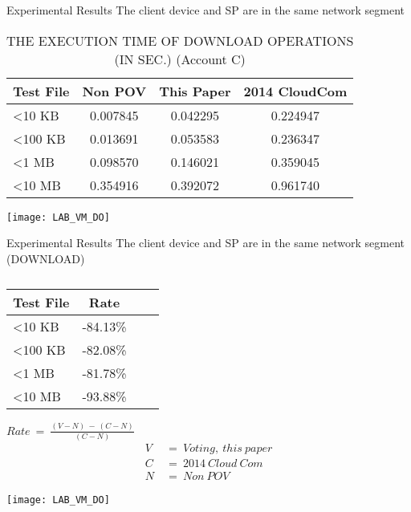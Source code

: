 \begin{frame}{Experimental Results}
{The client device and SP are in the same network segment}
	\scriptsize
    \begin{table}[] 
    \centering
    \caption{THE EXECUTION TIME OF \alert{DOWNLOAD} OPERATIONS (IN SEC.) (Account C)}
    \begin{tabular}{lccc}
        Test File        & Non POV  & This Paper & 2014 CloudCom \\ \hline
        \textless 10 KB  & 0.007845 & 0.042295   & 0.224947      \\ \hline
        \textless 100 KB & 0.013691 & 0.053583   & 0.236347      \\ \hline
        \textless 1 MB   & 0.098570 & 0.146021   & 0.359045      \\ \hline
        \textless 10 MB  & 0.354916 & 0.392072   & 0.961740      \\ \hline
    \end{tabular}
    \end{table}
    \begin{center}
	    \texttt{[image: LAB\_VM\_DO]}
    \end{center}
\end{frame}

\begin{frame}{Experimental Results}
{The client device and SP are in the same network segment (DOWNLOAD)}
	\begin{minipage}[c]{0.4\textwidth}
    \scriptsize
    \begin{table}[] 
    \centering
    \caption{}
    \begin{tabular}{lccc}
        Test File        & Rate     \\ \hline
        \textless 10 KB  & -84.13\% \\ \hline
        \textless 100 KB & -82.08\% \\ \hline
        \textless 1 MB   & -81.78\% \\ \hline
        \textless 10 MB  & -93.88\% \\ \hline
    \end{tabular}
    \end{table}
    \begin{center}
		$Rate\ =\ \frac{(V-N)\ -\ (C-N)}{(C-N)}$
        \begin{equation*} \label{eq4}
                \begin{split}
                        V\ & =\ Voting,\ this\ paper\\
                        C\ & =\ 2014\ Cloud\ Com\\
                        N\ & =\ Non\ POV
                \end{split}
        \end{equation*}
    \end{center}
    \end{minipage}%
    \begin{minipage}[c]{0.6\textwidth}
	\texttt{[image: LAB\_VM\_DO]}
    \end{minipage}
\end{frame}

